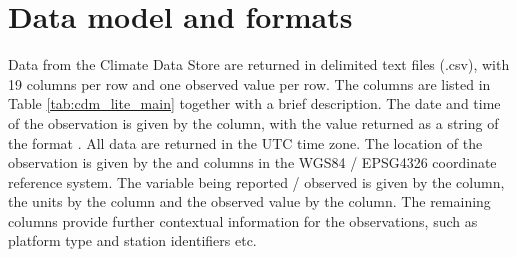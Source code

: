 \section{Data model and formats} \label{data_model}
Data from the Climate Data Store are returned in delimited text files (.csv), with 19 columns per row and one observed value per row. 
The columns are listed in Table \ref{tab:cdm_lite_main} together with a brief description.  
The date and time of the observation is given by the  column, with the value returned as a string of the format . 
All data are returned in the UTC time zone.
The location of the observation is given by the  and  columns in the WGS84 / EPSG4326 coordinate reference system. 
The variable being reported / observed is given by the  column, the units by the  column and the observed value by the  column. 
The remaining columns provide further contextual information for the observations, such as platform type and station identifiers etc. 



